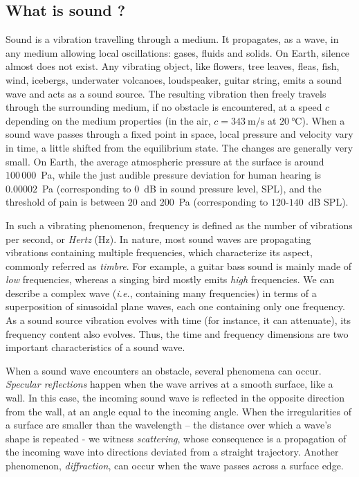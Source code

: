 \subsection{What is sound ?}

Sound is a vibration travelling through a medium. It propagates, as a wave, in any medium allowing local oscillations: gases, fluids and solids. On Earth, silence almost does not exist. Any vibrating object, like flowers, tree leaves, fleas, fish, wind, icebergs, underwater volcanoes, loudspeaker, guitar string, emits a sound wave and acts as a sound source. The resulting vibration then freely travels through the surrounding medium, if no obstacle is encountered, at a speed $c$ depending on the medium properties (in the air, $c = \SI{343}{\meter\per\second}$ at $\SI{20}{\degreeCelsius}$). When a sound wave passes through a fixed point in space, local pressure and velocity vary in time, a little shifted from the equilibrium state. The changes are generally very small. On Earth, the average atmospheric pressure at the surface is around $100\,000$~Pa, while the just audible pressure deviation for human hearing is $0.00002$~Pa (corresponding to $0$~dB in sound pressure level, SPL), and the threshold of pain is between $20$ and $200$~Pa (corresponding to $120$-$140$~dB SPL). 

In such a vibrating phenomenon, frequency is defined as the number of vibrations per second, or \textit{Hertz} (Hz). In nature, most sound waves are propagating vibrations containing multiple frequencies, which characterize its  aspect, commonly referred as \textit{timbre}. For example, a guitar bass sound is mainly made of \textit{low} frequencies, whereas a singing bird mostly emits \textit{high} frequencies. We can describe a complex wave (\emph{i.e.}, containing many frequencies) in terms of a superposition of sinusoidal plane waves, each one containing only one frequency. As a sound source vibration evolves with time (for instance, it can attenuate), its frequency content also evolves. Thus, the time and frequency dimensions are two important characteristics of a sound wave.

When a sound wave encounters an obstacle, several phenomena can occur. \textit{Specular reflections} happen when the wave arrives at a smooth surface, like a wall. In this case, the incoming sound wave is reflected in the opposite direction from the wall, at an angle equal to the incoming angle. When the irregularities of a surface are smaller than the wavelength -- the distance over which a wave's shape is repeated - we witness \textit{scattering}, whose consequence is a propagation of the incoming wave into directions deviated from a straight trajectory. Another phenomenon, \textit{diffraction}, can occur when the wave passes across a surface edge.

